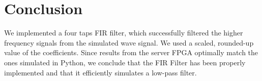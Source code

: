 \documentclass[11pt,a4paper,twocolumn]{IEEEtran}
\begin{document}
	\section{Conclusion}
	We implemented a four taps FIR filter, which successfully filtered the higher frequency signals from the simulated wave signal. We used a scaled, rounded-up value of the coefficients.
	Since results from the server FPGA optimally match the ones
	simulated in Python, we conclude that the FIR Filter has been properly implemented and that it
	efficiently simulates a low-pass filter.
\end{document}
